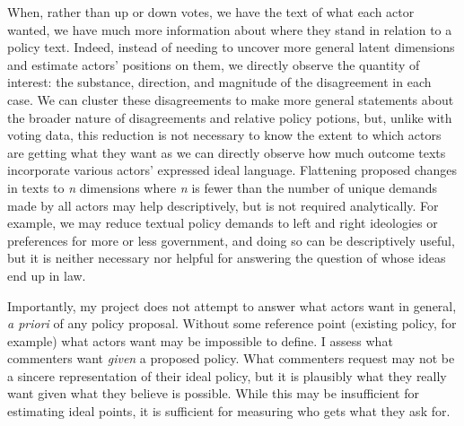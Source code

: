 When, rather than up or down votes, we have the text of what each actor wanted, we have much more information about where they stand in relation to a policy text. Indeed, instead of needing to uncover more general latent dimensions and estimate actors' positions on them, we directly observe the quantity of interest: the substance, direction, and magnitude of the disagreement in each case. We can cluster these disagreements to make more general statements about the broader nature of disagreements and relative policy potions, but, unlike with voting data, this reduction is not necessary to know the extent to which actors are getting what they want as we can directly observe how much outcome texts incorporate various actors' expressed ideal language. Flattening proposed changes in texts to \textit{n} dimensions where \textit{n} is fewer than the number of unique demands made by all actors may help descriptively, but is not required analytically. For example, we may reduce textual policy demands to left and right ideologies or preferences for more or less government, and doing so can be descriptively useful, but it is neither necessary nor helpful for answering the question of whose ideas end up in law.

Importantly, my project does not attempt to answer what actors want in general, \textit{a priori} of any policy proposal. Without some reference point (existing policy, for example) what actors want may be impossible to define. I assess what commenters want \textit{given} a proposed policy. What commenters request may not be a sincere representation of their ideal policy, but it is plausibly what they really want given what they believe is possible. While this may be insufficient for estimating ideal points, it is sufficient for measuring who gets what they ask for. 

